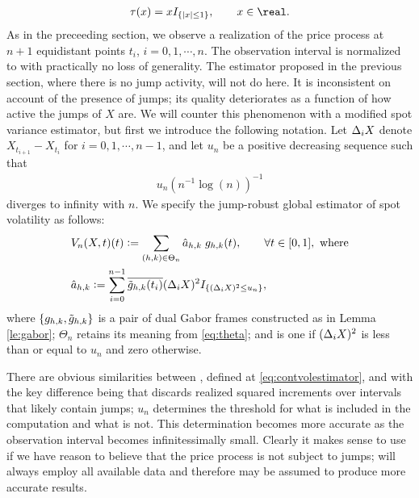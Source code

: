 \begin{align}
  \tau(x) = xI_{\{\vert x \vert \le 1\}}, \qquad x \in \real. \notag
  \label{}
\end{align}
As in the preceeding section, we observe a realization of the price process at $n + 1$ equidistant points $t_i$,  $i = 0, 1, \cdots, n$. The observation interval is normalized to \domain with practically no loss of generality.  The estimator proposed in the previous section, where there is no jump activity, will not do here. It is inconsistent on account of the presence of jumps; its quality deteriorates as a function of how active the jumps of $X$ are. We will counter this phenomenon with a modified spot variance estimator, but first we introduce the following notation. Let $\Delta_i X$ denote $X_{t_{i+1}} - X_{t_i}$ for $i = 0, 1,\cdots, n-1$, and let $u_n$  be a positive decreasing sequence such that 
\begin{align}
  u_n (n^{-1} \log(n))^{-1} 
  \label{}
\end{align}
 diverges to infinity with $n$. We specify the jump-robust global estimator of  spot volatility as follows: 
\begin{align}
  \label{eq:jumpvolestimator}
  &V_n(X, t)(t) := \sum_{(h,k) \in \Theta_n} \hat{a}_{h,k}\;g_{h,k}(t), \qquad \forall t \in [0,1], \text{ where}\\
  &\hat{a}_{h,k} := \sum_{i =0}^{n-1} \overline{\tilde{g}_{h,k}(t_i)} (\Delta_i X)^2 I_{\{(\Delta_i X)^2 \le u_n\}},
\end{align}
where $\{g_{h,k}, \tilde{g}_{h,k}\}$ is a pair of dual Gabor frames constructed as in Lemma \eqref{le:gabor}; $\Theta_n$ retains its meaning from \eqref{eq:theta}; and \indx is one if $(\Delta_i X)^2$ is less than or equal to  $u_n$ and zero otherwise.  


There are obvious similarities between \svnx, defined at  \eqref{eq:contvolestimator},  and \jvn with the key difference being that \jvn discards realized squared increments over intervals that likely contain jumps; $u_n$ determines the threshold for what is included in the computation and what is not. This determination becomes more accurate as the observation interval becomes infinitessimally small. Clearly it makes sense to use \svnx if we have reason to believe that the price process is not subject to jumps; \svnx will always employ   all available data and therefore may be assumed to produce more accurate results.  


